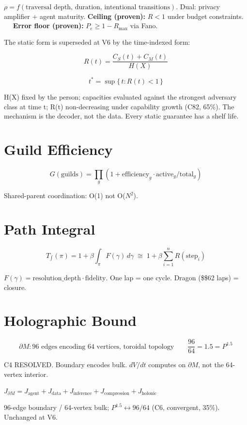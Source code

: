 \documentclass[
]{article}
\begin{document}
\(\rho = f(\text{traversal depth, duration, intentional transitions})\).
Dual: privacy amplifier + agent maturity. \textbf{Ceiling (proven):}
\(R < 1\) under budget constraints. \(\quad\) \textbf{Error floor
(proven):} \(P_e \geq 1 - R_{\max}\) via Fano.

The static form is superseded at V6 by the time-indexed form:

\[R(t) = \frac{C_S(t) + C_M(t)}{H(X)}\]

\[t^* = \sup\{\, t : R(t) < 1 \,\}\]

H(X) fixed by the person; capacities evaluated against the strongest
adversary class at time t; R(t) non-decreasing under capability growth
(C82, 65\%). The mechanism is the decoder, not the data. Every static
guarantee has a shelf life.

\section{Guild Efficiency}\label{guild-efficiency}

\[G(\text{guilds}) = \prod_g (1 + \text{efficiency}_g \cdot \text{active}_g / \text{total}_g)\]

Shared-parent coordination: O(1) not O(\(N^2\)).

\section{Path Integral}\label{path-integral}

\[T_{\!\int}(\pi) = 1 + \beta \int_\pi F(\gamma)\,d\gamma \;\cong\; 1 + \beta \sum_{i=1}^{n} R(\text{step}_i)\]

\(F(\gamma) = \text{resolution\_depth} \cdot \text{fidelity}\). One lap
= one cycle. Dragon (\$\geq\$62 laps) = closure.

\section{Holographic Bound}\label{holographic-bound}

\[\partial M: \text{96 edges encoding 64 vertices, toroidal topology} \qquad \frac{96}{64} = 1.5 = P^{1.5}\]

C4 RESOLVED. Boundary encodes bulk. \(dV/dt\) computes on
\(\partial M\), not the 64-vertex interior.

\(J_{\partial M} = J_{\text{agent}} + J_{\text{data}} + J_{\text{inference}} + J_{\text{compression}} + J_{\text{holonic}}\)

96-edge boundary / 64-vertex bulk; \(P^{1.5} \leftrightarrow 96/64\)
(C6, convergent, 35\%). Unchanged at V6.
\end{document}
